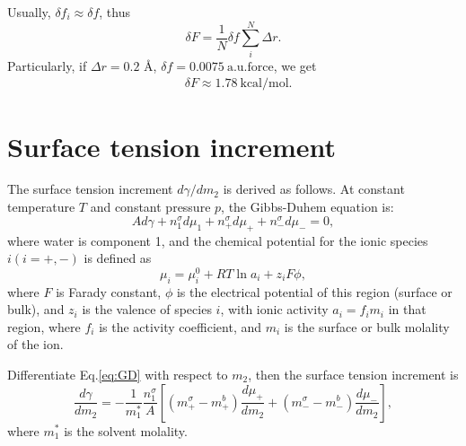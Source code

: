 Usually, $\delta{f_i}\approx\delta{f}$, thus
\begin{equation}
  \delta{F} = \frac{1}{N}\delta{f}\sum_{i}^{N}{\Delta{r}}.
\label{eq:dleta_f-2}
\end{equation}
Particularly, if $\Delta{r}= 0.2$ \AA, $\delta{f}=0.0075\ \text{a.u.force}$, we get 
\begin{equation}
\begin{split}
  &\delta{F} \approx 1.78\ \text{kcal/mol}.\nonumber
\end{split}
\label{eq:dleta_f-3}
\end{equation}

\section{Surface tension increment}\label{surface_tension_increment}
The surface tension increment $d\gamma/{dm_2}$ is derived as follows.
At constant temperature $T$ and constant pressure $p$, the Gibbs-Duhem equation is: \cite{Pegram2006}
\begin{equation}
Ad\gamma+n_1^{\sigma}d\mu_1 + {n_+^{\sigma}d\mu_+} + {n_-^{\sigma}d\mu_-} =0,
\label{eq:GD}
\end{equation}
where water is component 1, and the chemical potential for the ionic species $i(i=+,-)$ is defined as 
\begin{equation}
\mu_i =\mu_i^0+RT\ln{a}_i+z_iF\phi,
\label{eq:GDb}
\end{equation}
where $F$ is Farady constant, $\phi$ is the electrical potential of this region (surface or bulk), and $z_i$ is the valence of species $i$, with ionic 
activity $a_i=f_im_i$ in that region, where $f_i$ is the activity coefficient, and $m_i$ is the surface or bulk molality of the ion.

Differentiate Eq.\thinspace\ref{eq:GD} with respect to $m_2$, then
the surface tension increment is
\begin{equation}
\frac{d\gamma}{dm_2} = -\frac{1}{m_1^*}\frac{n_1^{\sigma}}{A} [(m_+^{\sigma} -m_+^{b})\frac{d\mu_+}{dm_2} + (m_-^{\sigma} -m_-^b)\frac{d\mu_-}{dm_2}],
\label{eq:h}
\end{equation}
where $m_1^*$ is the solvent molality. 

